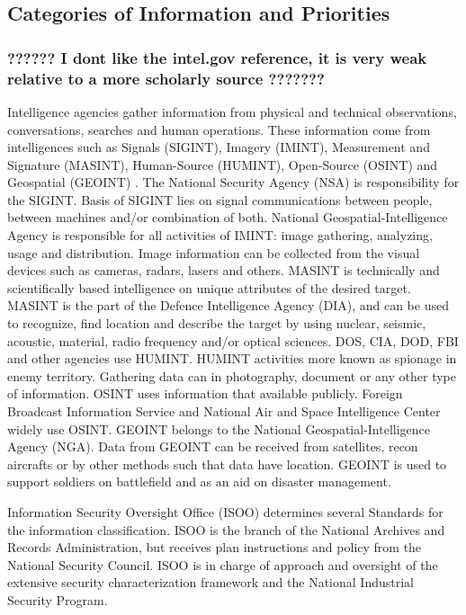 \documentclass{report}
\begin{document}
\subsection{Categories of Information and Priorities}

\subsubsection{?????? I dont like the intel.gov reference, it is very weak relative to a more scholarly source ???????}

Intelligence agencies gather information from physical and technical observations, conversations, searches and human operations. These information come from intelligences such as Signals (SIGINT), Imagery (IMINT), Measurement and Signature (MASINT), Human-Source (HUMINT), Open-Source (OSINT) and Geospatial (GEOINT) \cite{Intelligen}. The National Security Agency (NSA) is responsibility for the SIGINT. Basis of SIGINT lies on signal communications between people, between machines and/or combination of both. National Geospatial-Intelligence Agency is responsible for all activities of IMINT: image gathering, analyzing, usage and distribution. Image information can be collected from the visual devices such as cameras, radars, lasers and others. MASINT is technically and scientifically based intelligence on unique attributes of the desired target. MASINT is the part of the Defence Intelligence Agency (DIA), and can be used to recognize, find location and describe the target by using nuclear, seismic, acoustic, material, radio frequency and/or optical sciences. DOS, CIA, DOD, FBI and other agencies use HUMINT. HUMINT activities more known as spionage in enemy territory. Gathering data can in photography, document or any other type of information. OSINT uses information that available publicly. Foreign Broadcast Information Service and National Air and Space Intelligence Center widely use OSINT. GEOINT belongs to the National Geospatial-Intelligence Agency (NGA). Data from GEOINT can be received from satellites, recon aircrafts or by other methods such that data have location. GEOINT is used to support soldiers on battlefield and as an aid on disaster management.

Information Security Oversight Office (ISOO) determines several Standards for the information classification. ISOO is the branch of the National Archives and Records Administration, but receives plan instructions and policy from the National Security Council. ISOO is in charge of approach and oversight of the extensive security characterization framework and the National Industrial Security Program.
\end{document}
